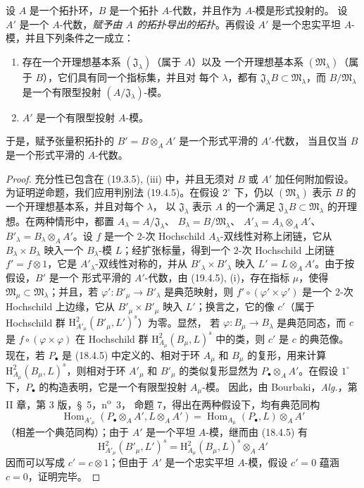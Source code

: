 \begin{corollary}[19.4.6]
\label{0.19.4.6-fr}
设 $A$ 是一个拓扑环，$B$ 是一个拓扑 $A$-代数，并且作为 $A$-模是形式投射的。
设 $A'$ 是一个 $A$-代数，\emph{赋予由 $A$ 的拓扑导出的拓扑}。再假设
$A'$ 是一个忠实平坦 $A$-模，并且下列条件之一成立：
\begin{enumerate}
  \item[$1^\circ$] 存在一个开理想基本系 $(\mathfrak J_\lambda)$（属于 $A$）以及
  一个开理想基本系 $(\mathfrak M_\lambda)$（属于 $B$），它们具有同一个指标集，并且对
  每个 $\lambda$，都有 $\mathfrak J_\lambda B\subset\mathfrak M_\lambda$，而
  $B/\mathfrak M_\lambda$ 是一个有限型投射
  $(A/\mathfrak J_\lambda)$-模。
  \item[$2^\circ$] $A'$ 是一个有限型投射 $A$-模。
\end{enumerate}
于是，赋予张量积拓扑的 $B'=B\otimes_A A'$ 是一个形式平滑的 $A'$-代数，
当且仅当 $B$ 是一个形式平滑的 $A$-代数。
\end{corollary}

\begin{proof}
充分性已包含在 (19.3.5), (iii) 中，并且无须对 $B$ 或 $A'$ 加任何附加假设。
为证明逆命题，我们应用判别法 (19.4.5)。在假设 $2^\circ$ 下，仍以
$(\mathfrak M_\lambda)$ 表示 $B$ 的一个开理想基本系，并且对每个 $\lambda$，
以 $\mathfrak J_\lambda$ 表示 $A$ 的一个满足
$\mathfrak J_\lambda B\subset\mathfrak M_\lambda$ 的开理想。在两种情形中，都置
$A_\lambda=A/\mathfrak J_\lambda$、
$B_\lambda=B/\mathfrak M_\lambda$、
$A'_\lambda=A_\lambda\otimes_A A'$、
$B'_\lambda=B_\lambda\otimes_A A'$。设 $f$ 是一个 $2$-次 Hochschild
$A_\lambda$-双线性对称上闭链，它从 $B_\lambda\times B_\lambda$ 映入一个
$B_\lambda$-模 $L$；经扩张标量，得到一个 $2$-次 Hochschild 上闭链
$f'=f\otimes1$，它是 $A'_\lambda$-双线性对称的，并从
$B'_\lambda\times B'_\lambda$ 映入 $L'=L\otimes_A A'$。由于按假设，$B'$ 是一个
形式平滑的 $A'$-代数，由 (19.4.5), (i)，存在指标 $\mu$，使得
$\mathfrak M_\mu\subset\mathfrak M_\lambda$；并且，若
$\varphi':B'_\mu\to B'_\lambda$ 是典范映射，则
$f'\circ(\varphi'\times\varphi')$ 是一个 $2$-次 Hochschild 上边缘，它从
$B'_\mu\times B'_\mu$ 映入 $L'$；换言之，它的像 $c'$（属于 Hochschild 群
$\mathrm H^2_{A'_\mu}(B'_\mu,L')^s$）为零。显然，
若 $\varphi:B_\mu\to B_\lambda$ 是典范同态，而 $c$ 是
$f\circ(\varphi\times\varphi)$ 在 Hochschild 群
$\mathrm H^2_{A_\mu}(B_\mu,L)^s$ 中的类，则 $c'$ 是 $c$ 的典范像。
现在，若 $P_\bullet$ 是 (18.4.5) 中定义的、相对于环 $A_\mu$ 和 $B_\mu$
的复形，用来计算 $\mathrm H^2_{A_\mu}(B_\mu,L)^s$，则相对于环
$A'_\mu$ 和 $B'_\mu$ 的类似复形显然为 $P_\bullet\otimes_A A'$。在假设
$1^\circ$ 下，$P_\bullet$ 的构造表明，它是一个有限型投射 $A_\mu$-模。
因此，由 Bourbaki，\emph{Alg.}，第 II 章，第 3 版，§~5，n\textsuperscript{o}~3，
命题 7，得出在两种假设下，均有典范同构
\[
  \operatorname{Hom}_{A'_\mu}(P_\bullet\otimes_A A',L\otimes_A A')
  =\operatorname{Hom}_{A_\mu}(P_\bullet,L)\otimes_A A'
\]
（相差一个典范同构）；由于 $A'$ 是一个平坦 $A$-模，继而由 (18.4.5) 有
\[
  \mathrm H^2_{A'_\mu}(B'_\mu,L')^s
  =\mathrm H^2_{A_\mu}(B_\mu,L)^s\otimes_A A'
\]
因而可以写成 $c'=c\otimes1$；但由于 $A'$ 是一个忠实平坦 $A$-模，假设
$c'=0$ 蕴涵 $c=0$，证明完毕。
\end{proof}

